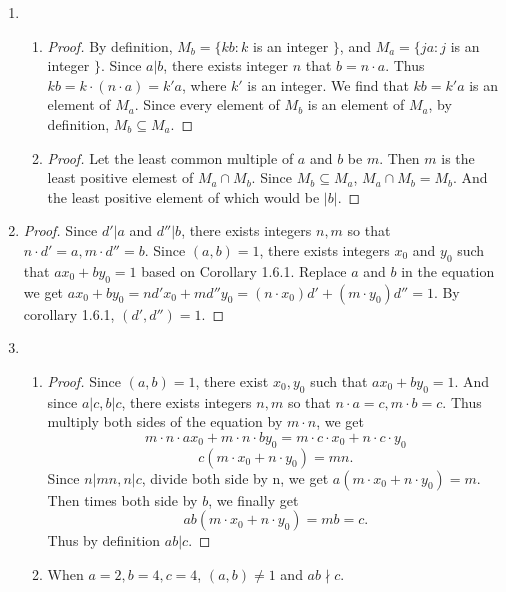 \documentclass[11pt,a4paper]{article}
\begin{document}
\hrulefill

\begin{enumerate}
	\item \begin{enumerate}
		\item \begin{proof} By definition, $M_b = \{kb: k$ is an integer \(\}\), and $M_a = \{ja: j$ is an integer \(\}\). Since $a|b$, there exists integer $n$ that $b=n\cdot a$. Thus $kb = k\cdot (n\cdot a) = k'a$, where $k'$ is an integer. We find that $kb=k'a$ is an element of $M_a$. Since every element of $M_b$ is an element of $M_a$, by definition, $M_b \subseteq M_a$. \end{proof}
		\item \begin{proof} Let the least common multiple of $a$ and $b$ be $m$. Then $m$ is the least positive elemest of $M_a \cap M_b$. Since $M_b \subseteq M_a$, $M_a \cap M_b = M_b$. And the least positive element of which would be $|b|$.  \end{proof}
	\end{enumerate}

	\item \begin{proof} Since $d'|a$ and $d''|b$, there exists integers $n, m$ so that $n\cdot d' = a, m\cdot d'' = b$. Since $(a,b)=1$, there exists integers $x_0$ and $y_0$ such that $ax_0+by_0=1$ based on Corollary 1.6.1. Replace $a$ and $b$ in the equation we get $ax_0+by_0=nd'x_0+md''y_0 = (n\cdot x_0)d'+(m\cdot y_0)d'' = 1$. By corollary 1.6.1, $(d', d'')=1$.  \end{proof}

	\item \begin{enumerate}
		\item \begin{proof} Since $(a,b)=1$, there exist $x_0, y_0$ such that $ax_0+by_0=1$. And since $a|c, b|c$, there exists integers $n, m$ so that $n\cdot a = c, m\cdot b = c$. Thus multiply both sides of the equation by $m\cdot n$, we get \[m\cdot n\cdot ax_0+m\cdot n\cdot by_0= m\cdot c\cdot x_0 + n\cdot c\cdot y_0\]\[c(m\cdot x_0+n\cdot y_0)= mn.\] Since $n|mn, n|c$, divide both side by n, we get $a(m\cdot x_0+n\cdot y_0)= m$. Then times both side by $b$, we finally get \[ ab(m\cdot x_0+n\cdot y_0)= mb = c.\] Thus by definition $ab|c$. \end{proof}
		\item When $a = 2, b = 4, c = 4$, $(a,b)\neq 1$ and $ab\nmid c$.
	\end{enumerate}


\end{enumerate}
\end{document}
